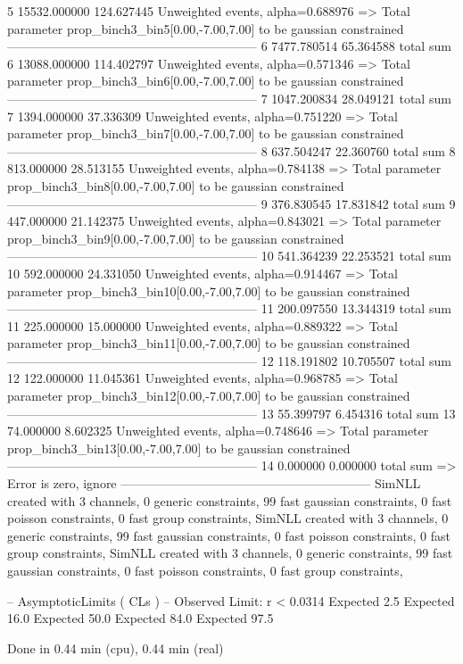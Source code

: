 5          15532.000000    124.627445      Unweighted events, alpha=0.688976
  => Total parameter prop_binch3_bin5[0.00,-7.00,7.00] to be gaussian constrained
------------------------------------------------------------
6          7477.780514     65.364588       total sum                     
6          13088.000000    114.402797      Unweighted events, alpha=0.571346
  => Total parameter prop_binch3_bin6[0.00,-7.00,7.00] to be gaussian constrained
------------------------------------------------------------
7          1047.200834     28.049121       total sum                     
7          1394.000000     37.336309       Unweighted events, alpha=0.751220
  => Total parameter prop_binch3_bin7[0.00,-7.00,7.00] to be gaussian constrained
------------------------------------------------------------
8          637.504247      22.360760       total sum                     
8          813.000000      28.513155       Unweighted events, alpha=0.784138
  => Total parameter prop_binch3_bin8[0.00,-7.00,7.00] to be gaussian constrained
------------------------------------------------------------
9          376.830545      17.831842       total sum                     
9          447.000000      21.142375       Unweighted events, alpha=0.843021
  => Total parameter prop_binch3_bin9[0.00,-7.00,7.00] to be gaussian constrained
------------------------------------------------------------
10         541.364239      22.253521       total sum                     
10         592.000000      24.331050       Unweighted events, alpha=0.914467
  => Total parameter prop_binch3_bin10[0.00,-7.00,7.00] to be gaussian constrained
------------------------------------------------------------
11         200.097550      13.344319       total sum                     
11         225.000000      15.000000       Unweighted events, alpha=0.889322
  => Total parameter prop_binch3_bin11[0.00,-7.00,7.00] to be gaussian constrained
------------------------------------------------------------
12         118.191802      10.705507       total sum                     
12         122.000000      11.045361       Unweighted events, alpha=0.968785
  => Total parameter prop_binch3_bin12[0.00,-7.00,7.00] to be gaussian constrained
------------------------------------------------------------
13         55.399797       6.454316        total sum                     
13         74.000000       8.602325        Unweighted events, alpha=0.748646
  => Total parameter prop_binch3_bin13[0.00,-7.00,7.00] to be gaussian constrained
------------------------------------------------------------
14         0.000000        0.000000        total sum                     
  => Error is zero, ignore      
------------------------------------------------------------
SimNLL created with 3 channels, 0 generic constraints, 99 fast gaussian constraints, 0 fast poisson constraints, 0 fast group constraints, 
SimNLL created with 3 channels, 0 generic constraints, 99 fast gaussian constraints, 0 fast poisson constraints, 0 fast group constraints, 
SimNLL created with 3 channels, 0 generic constraints, 99 fast gaussian constraints, 0 fast poisson constraints, 0 fast group constraints, 

 -- AsymptoticLimits ( CLs ) --
Observed Limit: r < 0.0314
Expected  2.5%
Expected 16.0%
Expected 50.0%
Expected 84.0%
Expected 97.5%

Done in 0.44 min (cpu), 0.44 min (real)
